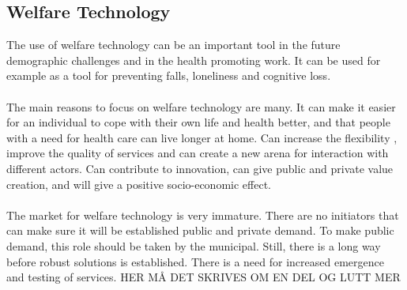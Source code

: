 \subsection{Welfare Technology}
The use of welfare technology can be an important tool in the future demographic challenges and in the health promoting work. It can be used for example as a tool for preventing falls, loneliness and cognitive loss. \\ \\
The main reasons to focus on welfare technology are many. It can make it easier for an individual to cope with their own life and health better, and that people with a need for health care can live longer at home. Can increase the flexibility , improve the quality of services and can create a new arena for interaction with different actors. Can contribute to innovation, can give public and private value creation, and will give a positive socio-economic effect. \\ \\
The market for welfare technology is very immature. There are no initiators that can make sure it will be established public and private demand. To make public demand, this role should be taken by the municipal. Still, there is a long way before robust solutions is established. There is a need for increased emergence and testing of services. \cite{welfare} HER MÅ DET SKRIVES OM EN DEL OG LUTT MER

